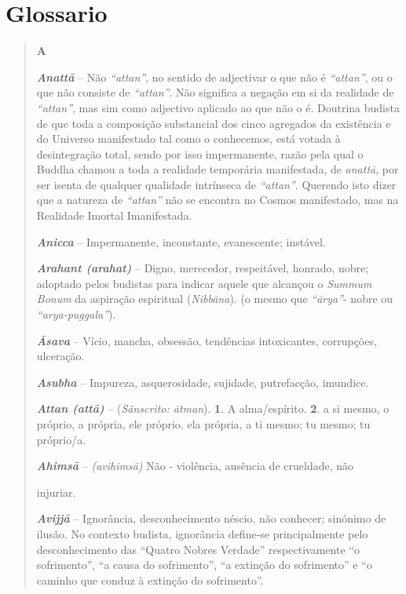 \chapter{Glossario}

\begin{quote}
\textbf{A}

\emph{\textbf{Anattā}} -- Não \emph{``attan''}, no sentido de adjectivar o que não é \emph{``attan''}, ou o que não consiste de \emph{``attan''}. Não significa a negação em si da realidade de \emph{``attan''}, mas sim como adjectivo aplicado ao que não o é. Doutrina budista de que toda a composição substancial dos cinco agregados da existência e do Universo manifestado tal como o conhecemos, está votada à desintegração total, sendo por isso impermanente, razão pela qual o Buddha chamou a toda a realidade temporária manifestada, de \emph{anattā}, por ser isenta de qualquer qualidade intrínseca de \emph{``attan''}. Querendo isto dizer que a natureza de \emph{``attan''} não se encontra no Cosmos manifestado, mas na Realidade Imortal Imanifestada.

\emph{\textbf{Anicca}} -- Impermanente, inconstante, evanescente; instável.

\emph{\textbf{Arahant (arahat)}} -- Digno, merecedor, respeitável, honrado, nobre; adoptado pelos budistas para indicar aquele que alcançou o \emph{Summum Bonum} da aspiração espiritual (\emph{Nibbāna}). (o mesmo que \emph{``ārya''}- nobre ou \emph{``arya-puggala''}).

\emph{\textbf{Āsava}} -- Vício, mancha, obsessão, tendências intoxicantes, corrupções, ulceração.

\emph{\textbf{Asubha}} -- Impureza, asquerosidade, sujidade, putrefacção, imundice.

\emph{\textbf{Attan (attā)}} -- (\emph{Sânscrito: ātman}). \textbf{1}. A alma/espírito. \textbf{2}. a si mesmo, o próprio, a própria, ele próprio, ela própria, a ti mesmo; tu mesmo; tu próprio/a.

\emph{\textbf{Ahimsā}} -- \emph{(avihimsā)} Não - violência, ausência de crueldade, não

injuriar.

\emph{\textbf{Avijjā}} -- Ignorância, desconhecimento néscio, não conhecer; sinónimo de ilusão. No contexto budista, ignorância define-se principalmente pelo desconhecimento das ``Quatro Nobres Verdade'' respectivamente ``o sofrimento'', ``a causa do sofrimento'', ``a extinção do sofrimento'' e ``o caminho que conduz à extinção do sofrimento''.


\end{quote}
